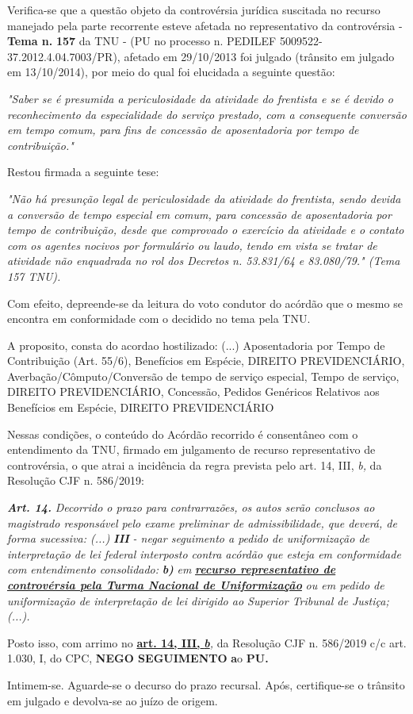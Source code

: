 \documentclass[12pt]{article}
\begin{document}
\justifying
\noindent Verifica-se que a questão objeto da controvérsia jurídica suscitada no recurso manejado pela parte recorrente esteve afetada no representativo da controvérsia - \textbf{Tema n. }\textbf{157} da TNU - (PU no processo n. PEDILEF 5009522-37.2012.4.04.7003/PR),  afetado em 29/10/2013 foi julgado (trânsito em julgado em 13/10/2014), por meio do qual foi elucidada a seguinte questão:

\noindent \textit{"Saber se é presumida a periculosidade da atividade do frentista e se é devido o reconhecimento da especialidade do serviço prestado, com a consequente conversão em tempo comum, para fins de concessão de aposentadoria por tempo de contribuição."}

\noindent Restou firmada a seguinte tese:

\noindent \textit{"Não há presunção legal de periculosidade da atividade do frentista, sendo devida a conversão de tempo especial em comum, para concessão de aposentadoria por tempo de contribuição, desde que comprovado o exercício da atividade e o contato com os agentes nocivos por formulário ou laudo, tendo em vista se tratar de atividade não enquadrada no rol dos Decretos n. 53.831/64 e 83.080/79." (Tema 157 TNU).}

\noindent Com efeito, depreende-se da leitura do voto condutor do acórdão que o mesmo se encontra em conformidade com o decidido no  tema pela TNU.

\noindent A proposito, consta do acordao hostilizado: (...) Aposentadoria por Tempo de Contribuição (Art. 55/6), Benefícios em Espécie, DIREITO PREVIDENCIÁRIO, Averbação/Cômputo/Conversão de tempo de serviço especial, Tempo de serviço, DIREITO PREVIDENCIÁRIO, Concessão, Pedidos Genéricos Relativos aos Benefícios em Espécie, DIREITO PREVIDENCIÁRIO

\noindent Nessas condições, o conteúdo do Acórdão recorrido é consentâneo com o entendimento da TNU, firmado em julgamento de recurso representativo de controvérsia, o que atrai a incidência da regra prevista pelo art. 14, III, \textit{b,} da Resolução CJF n. 586/2019:

\noindent \textit{\textbf{Art. 14.}}\textit{ Decorrido o prazo para contrarrazões, os autos serão conclusos ao magistrado responsável pelo exame preliminar de admissibilidade, que deverá, de forma sucessiva: (...) }\textit{\textbf{III }}\textit{- negar seguimento a pedido de uniformização de interpretação de lei federal interposto contra acórdão que esteja em conformidade com entendimento consolidado: }\textit{\textbf{b)}}\textit{ em }\uline{\textit{\textbf{recurso representativo de controvérsia pela Turma Nacional de Uniformização}}}\textit{ ou em pedido de uniformização de interpretação de lei dirigido ao Superior Tribunal de Justiça;(...).}

\noindent Posto isso, com arrimo no \uline{\textbf{art. 14, III, }}\uline{\textit{\textbf{b}}}\textit{,} da Resolução CJF n. 586/2019 c/c art. 1.030, I, do CPC, \textbf{NEGO SEGUIMENTO }\textbf{a}o\textbf{ PU}\textbf{.}

\noindent Intimem-se. Aguarde-se o decurso do prazo recursal. Após, certifique-se o trânsito em julgado e devolva-se ao juízo de origem.
\end{document}
